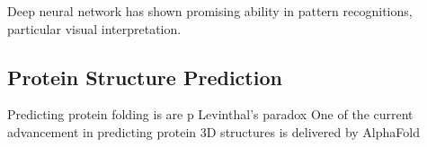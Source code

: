 Deep neural network has shown promising ability in pattern recognitions, particular visual interpretation.
\par 

\subsection{Protein Structure Prediction}
Predicting protein folding is  are p Levinthal's paradox One of the current advancement in predicting protein 3D structures is delivered by AlphaFold